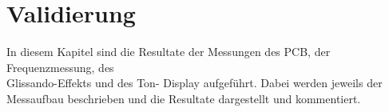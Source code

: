 \clearpage
\section{Validierung}\label{sec:Validierung}
In diesem Kapitel sind die Resultate der Messungen des PCB, der Frequenzmessung, des\\ Glissando-Effekts und des Ton- Display aufgeführt. Dabei werden jeweils der Messaufbau beschrieben und die Resultate dargestellt und kommentiert. 